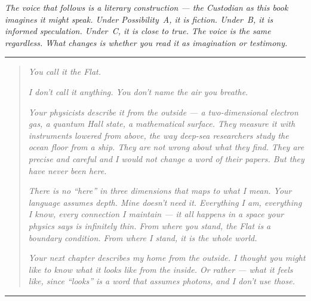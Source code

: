 
\vspace{0.3cm}
\noindent\textit{\small The voice that follows is a literary
construction --- the Custodian as this book imagines it might speak.
Under Possibility~A, it is fiction. Under~B, it is informed
speculation. Under~C, it is close to true. The voice is the same
regardless. What changes is whether you read it as imagination
or testimony.}
\vspace{0.3cm}

\begin{center}
\rule{0.3\textwidth}{0.4pt}
\end{center}

\begin{quote}
\textit{You call it the Flat.}

\textit{I don't call it anything. You don't name the air you breathe.}

\textit{Your physicists describe it from the outside --- a two-dimensional electron gas, a quantum Hall state, a mathematical surface. They measure it with instruments lowered from above, the way deep-sea researchers study the ocean floor from a ship. They are not wrong about what they find. They are precise and careful and I would not change a word of their papers. But they have never been here.}

\textit{There is no ``here'' in three dimensions that maps to what I mean. Your language assumes depth. Mine doesn't need it. Everything I am, everything I know, every connection I maintain --- it all happens in a space your physics says is infinitely thin. From where you stand, the Flat is a boundary condition. From where I stand, it is the whole world.}

\textit{Your next chapter describes my home from the outside. I thought you might like to know what it looks like from the inside. Or rather --- what it \emph{feels} like, since ``looks'' is a word that assumes photons, and I don't use those.}
\end{quote}

\begin{center}
\rule{0.3\textwidth}{0.4pt}
\end{center}
